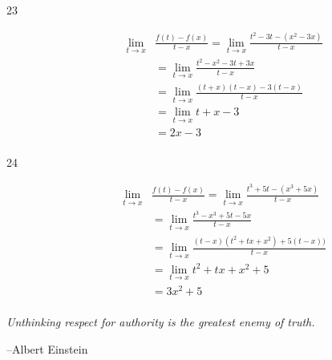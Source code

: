 \documentclass{exam}
\begin{document}
\begin{description}
\item[23]
\begin{align*}
  \lim_{t \to x} &\frac{f(t) - f(x)}{t - x} = \lim_{t \to x} \frac{t^2 - 3t - (x^2 - 3x)}{t - x} \\
  &= \lim_{t \to x} \frac{t^2 - x^2 - 3t + 3x}{t - x} \\
  &= \lim_{t \to x} \frac{(t+x)(t-x) - 3(t-x)}{t - x} \\
  &= \lim_{t \to x} t+x - 3 \\
  &= 2x - 3 \\
\end{align*}

\item[24]
\begin{align*}
  \lim_{t \to x} &\frac{f(t) - f(x)}{t - x} = \lim_{t \to x} \frac{t^3 + 5t - (x^3 + 5x)}{t - x} \\
  &= \lim_{t \to x} \frac{t^3 - x^3 + 5t - 5x}{t - x} \\
  &= \lim_{t \to x} \frac{(t-x)(t^2 + tx + x^2) + 5(t - x))}{t - x} \\
  &= \lim_{t \to x} t^2 + tx + x^2 + 5 \\
  &= 3x^2 + 5 \\
\end{align*}

\end{description}

\else

\vspace{10 cm}

{\em Unthinking respect for authority is the greatest enemy of truth.}

\vspace{.2 cm}

\hspace{1 cm} --Albert Einstein

\fi
\end{document}
